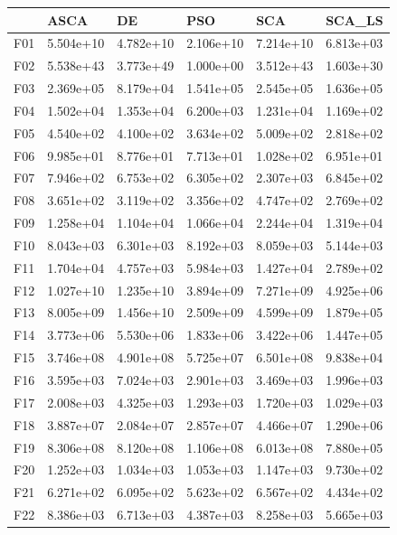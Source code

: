 \begin{tabular}{llllll}
\toprule
{} &       ASCA &         DE &        PSO &        SCA &     SCA\_LS \\
\midrule
F01  &  5.504e+10 &  4.782e+10 &  2.106e+10 &  7.214e+10 &  6.813e+03 \\
F02  &  5.538e+43 &  3.773e+49 &  1.000e+00 &  3.512e+43 &  1.603e+30 \\
F03  &  2.369e+05 &  8.179e+04 &  1.541e+05 &  2.545e+05 &  1.636e+05 \\
F04  &  1.502e+04 &  1.353e+04 &  6.200e+03 &  1.231e+04 &  1.169e+02 \\
F05  &  4.540e+02 &  4.100e+02 &  3.634e+02 &  5.009e+02 &  2.818e+02 \\
F06  &  9.985e+01 &  8.776e+01 &  7.713e+01 &  1.028e+02 &  6.951e+01 \\
F07  &  7.946e+02 &  6.753e+02 &  6.305e+02 &  2.307e+03 &  6.845e+02 \\
F08  &  3.651e+02 &  3.119e+02 &  3.356e+02 &  4.747e+02 &  2.769e+02 \\
F09  &  1.258e+04 &  1.104e+04 &  1.066e+04 &  2.244e+04 &  1.319e+04 \\
F10  &  8.043e+03 &  6.301e+03 &  8.192e+03 &  8.059e+03 &  5.144e+03 \\
F11  &  1.704e+04 &  4.757e+03 &  5.984e+03 &  1.427e+04 &  2.789e+02 \\
F12  &  1.027e+10 &  1.235e+10 &  3.894e+09 &  7.271e+09 &  4.925e+06 \\
F13  &  8.005e+09 &  1.456e+10 &  2.509e+09 &  4.599e+09 &  1.879e+05 \\
F14  &  3.773e+06 &  5.530e+06 &  1.833e+06 &  3.422e+06 &  1.447e+05 \\
F15  &  3.746e+08 &  4.901e+08 &  5.725e+07 &  6.501e+08 &  9.838e+04 \\
F16  &  3.595e+03 &  7.024e+03 &  2.901e+03 &  3.469e+03 &  1.996e+03 \\
F17  &  2.008e+03 &  4.325e+03 &  1.293e+03 &  1.720e+03 &  1.029e+03 \\
F18  &  3.887e+07 &  2.084e+07 &  2.857e+07 &  4.466e+07 &  1.290e+06 \\
F19  &  8.306e+08 &  8.120e+08 &  1.106e+08 &  6.013e+08 &  7.880e+05 \\
F20  &  1.252e+03 &  1.034e+03 &  1.053e+03 &  1.147e+03 &  9.730e+02 \\
F21  &  6.271e+02 &  6.095e+02 &  5.623e+02 &  6.567e+02 &  4.434e+02 \\
F22  &  8.386e+03 &  6.713e+03 &  4.387e+03 &  8.258e+03 &  5.665e+03 \\

\end{tabular}
